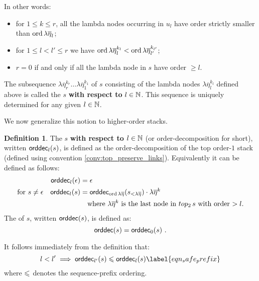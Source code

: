 \documentclass[a4paper]{article}[12pt]
\theoremstyle{remark}
\theoremstyle{definition}
\newtheorem{definition}{Definition}[section]
\newcommand\orddec{{\sf orddec}}
\begin{document}
\noindent In other words:
\begin{itemize}
\item for $1 \leq k \leq r$, all the lambda nodes occurring in $u_l$ have order
strictly smaller than $\mathop{\mathrm{ord}}{\lambda \overline{\eta}_l}$;
\item for $1\leq l<l'\leq r$ we have $\mathop{\mathrm{ord}}{\lambda \overline{\eta}_l^{k_l}}
< \mathop{\mathrm{ord}}{\lambda \overline{\eta}_{l'}^{k_{l'}}}$;
\item $r=0$ if and only if all the lambda node in $s$ have order $\geq l$.
\end{itemize}

The subsequence $\lambda \overline{\eta}_r^{k_r} \ldots \lambda\overline{\eta}_1^{k_1}$ of $s$ consisting of the lambda nodes $\lambda
\overline{\eta}_l^{k_l}$ defined above is called the  $s$ {\bf with respect to} $l\in\mathbb{N}$.
This sequence is uniquely determined for any given $l\in \mathbb{N}$.

\smallskip

We now generalize this notion to higher-order stacks.
\begin{definition}
The  $s$ {\bf with respect to $l\in \mathbb{N}$} (or
order-decomposition for short), written $\orddec_l(s)$, is defined as the order-decomposition of the top order-$1$ stack (defined using convention \ref{conv:top_preserve_links}). Equivalently it can be defined as follows:
\begin{align*}
  \orddec_l(\epsilon) &= \epsilon \\
    \mbox{for } s\neq\epsilon\quad \orddec_l(s) &=     \orddec_{\ord{\lambda\overline{\eta}}}(s_{<\lambda\overline{\eta}}) \cdot \lambda\overline{\eta}^k \\
& \mbox{\quad where } \lambda\overline{\eta}^k \mbox{ is the last node in $top_2\,s$ with order $>l$.}
\end{align*}
The  of $s$, written
$\orddec(s)$, is defined as:
$$
\orddec(s) = \orddec_0(s) \ .
$$
\end{definition}

It follows immediately from the definition that:
\begin{equation}
l<l' \implies \orddec_{l'}(s) \prefixof \orddec_{l}(s)
\label{eqn_safe_prefix}\end{equation}
where $\leqslant$ denotes the sequence-prefix ordering.
\end{document}
